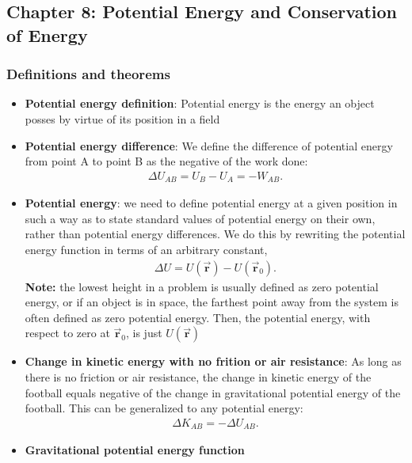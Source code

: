 \documentclass{report}
\begin{document}
    \pagebreak 
    \subsection{Chapter 8: Potential Energy and Conservation of Energy}
    \bigbreak \noindent 
    \subsubsection{Definitions and theorems}
    \begin{itemize}
        \item \textbf{Potential energy definition}: Potential energy is the energy an object posses by virtue of its position in a field
        \item \textbf{Potential energy difference}: We define the difference of potential energy from point A to point B as the negative of the work done:
            \begin{align*}
                \Delta U_{AB} = U_{B} - U_{A} = -W_{AB}
            .\end{align*}
        \item \textbf{Potential energy}: we need to define potential energy at a given position in such a way as to state standard values of potential energy on their own, rather than potential energy differences. We do this by rewriting the potential energy function in terms of an arbitrary constant,
            \begin{align*}
                \Delta U  = U(\vec{\mathbf{r}}) - U(\vec{\mathbf{r}}_{0})
            .\end{align*}
            \bigbreak \noindent 
            \textbf{Note:} the lowest height in a problem is usually defined as zero potential energy, or if an object is in space, the farthest point away from the system is often defined as zero potential energy. Then, the potential energy, with respect to zero at $\vec{\mathbf{r}}_{0}$, is just  $U(\vec{\mathbf{r}})$
        \item \textbf{Change in kinetic energy with no frition or air resistance}: As long as there is no friction or air resistance, the change in kinetic energy of the football equals negative of the change in gravitational potential energy of the football. This can be generalized to any potential energy:
            \begin{align*}
                \Delta K_{AB} = -\Delta U_{AB}
            .\end{align*}
        \item \textbf{Gravitational potential energy function}

\end{itemize}
\end{document}
